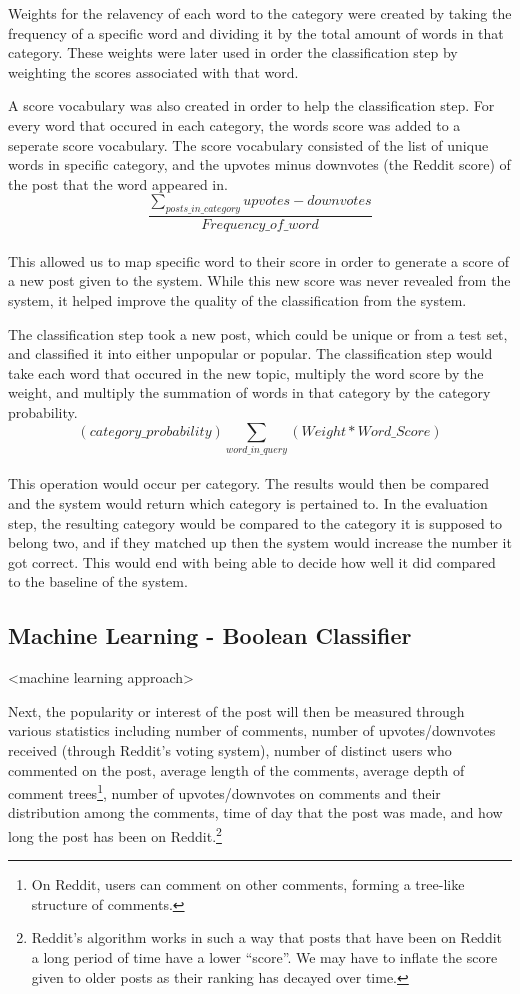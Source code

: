 \documentclass{acm_proc_article-sp}
\begin{document}
Weights for the relavency of each word to the category were created by taking the frequency of a specific word and dividing it by the total amount of words in that category. These weights were later used in order the classification step by weighting the scores associated with that word.

A score vocabulary was also created in order to help the classification step. For every word that occured in each category, the words score was added to a seperate score vocabulary. The score vocabulary consisted of the list of unique words in specific category, and the upvotes minus downvotes (the Reddit score) of the post that the word appeared in.\\
$$\frac{\sum_{posts\_in\_category} upvotes - downvotes}{Frequency\_of\_word}$$\\
This allowed us to map specific word to their score in order to generate a score of a new post given to the system. While this new score was never revealed from the system, it helped improve the quality of the classification from the system.

The classification step took a new post, which could be unique or from a test set, and classified it into either unpopular or popular. The classification step would take each word that occured in the new topic, multiply the word score by the weight, and multiply the summation of words in that category by the category probability.\\
$$(category\_probability)\sum_{word\_in\_query}(Weight * Word\_Score)$$\\
This operation would occur per category. The results would then be compared and the system would return which category is pertained to. In the evaluation step, the resulting category would be compared to the category it is supposed to belong two, and if they matched up then the system would increase the number it got correct. This would end with being able to decide how well it did compared to the baseline of the system.



\subsection{Machine Learning - Boolean Classifier}
<machine learning approach>

Next, the popularity or interest of the post will then be measured through various statistics including
number of comments, number of upvotes/downvotes received (through Reddit's voting system), number
of distinct users who commented on the post, average length of the comments, average depth of
comment trees\footnote{On Reddit, users can comment on other comments, forming a tree-like structure of comments.},
number of upvotes/downvotes on comments and their distribution among the comments, time of day that the post was made,
and how long the post has been on Reddit.\footnote{Reddit's algorithm works in such a way that posts that have been on Reddit
a long period of time have a lower ``score''. We may have to inflate the score given to older posts as their ranking
has decayed over time.}
\end{document}
